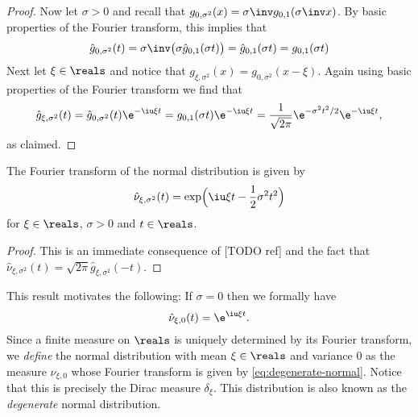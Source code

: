 \documentclass[article, a4paper, 11pt, oneside]{memoir}
\numberwithin{equation}{chapter}
\begin{document}
\begin{proof}
    Now let $\sigma > 0$ and recall that $g_{0,\sigma^2}(x) = \sigma\inv g_{0,1}(\sigma\inv x)$. By basic properties of the Fourier transform, this implies that
    \begin{equation*}
        \hat{g}_{0,\sigma^2}(t)
            = \sigma\inv \bigl( \sigma \hat{g}_{0,1}(\sigma t) \bigr)
            = \hat{g}_{0,1}(\sigma t)
            = g_{0,1}(\sigma t)
    \end{equation*}
    Next let $\xi \in \reals$ and notice that $g_{\xi,\sigma^2}(x) = g_{0,\sigma^2}(x - \xi)$. Again using basic properties of the Fourier transform we find that
    \begin{equation*}
        \hat{g}_{\xi,\sigma^2}(t)
            = \hat{g}_{0,\sigma^2}(t) \e^{-\iu \xi t}
            = g_{0,1}(\sigma t) \e^{-\iu \xi t}
            = \frac{1}{\sqrt{2\pi}} \e^{-\sigma^2 t^2 / 2} \e^{-\iu \xi t},
    \end{equation*}
    as claimed.
\end{proof}


\begin{theorem}
    The Fourier transform of the normal distribution is given by
    \begin{equation*}
        \hat{\nu}_{\xi,\sigma^2}(t)
            = \exp\Bigl( \iu \xi t - \frac{1}{2} \sigma^2 t^2 \Bigr)
    \end{equation*}
    for $\xi \in \reals$, $\sigma > 0$ and $t \in \reals$.
\end{theorem}

\begin{proof}
    This is an immediate consequence of [TODO ref] and the fact that $\hat{\nu}_{\xi,\sigma^2}(t) = \sqrt{2\pi} \hat{g}_{\xi,\sigma^2}(-t)$.
\end{proof}

This result motivates the following: If $\sigma = 0$ then we formally have
%
\begin{equation}
    \label{eq:degenerate-normal}
    \hat{\nu}_{\xi,0}(t)
        = \e^{\iu \xi t}.
\end{equation}
%
Since a finite measure on $\reals$ is uniquely determined by its Fourier transform, we \emph{define} the normal distribution with mean $\xi \in \reals$ and variance $0$ as the measure $\nu_{\xi,0}$ whose Fourier transform is given by \cref{eq:degenerate-normal}. Notice that this is precisely the Dirac measure $\delta_\xi$. This distribution is also known as the \emph{degenerate} normal distribution.
\end{document}
